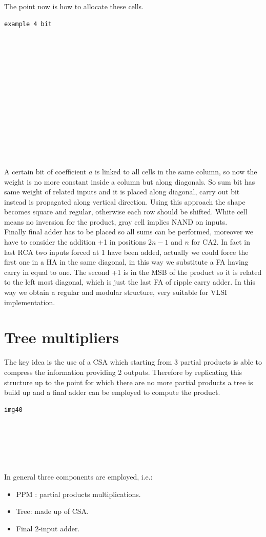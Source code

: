 The point now is how to allocate these cells.

\begin{verbatim}
example 4 bit














\end{verbatim}

A certain bit of coefficient $a$ is linked to all cells in the same column, so now the weight is no more constant inside a column but along diagonals. So sum bit has same weight of related inputs and it is placed along diagonal, carry out bit instead is propagated along vertical direction.
Using this approach the shape becomes square and regular, otherwise each row should be shifted. White cell means no inversion for the product, gray cell implies NAND on inputs.\\

Finally final adder has to be placed so all sums can be performed, moreover we have to consider the addition +1 in positions $2n-1$ and $n$ for CA2. In fact in last RCA two inputs forced at 1 have been added, actually we could force the first one in a HA in the same diagonal, in this way we substitute a FA having carry in equal to one. The second +1 is in the MSB of the product so it is related to the left most diagonal, which is just the last FA of ripple carry adder. In this way we obtain a regular and modular structure, very suitable for VLSI implementation.

\section{Tree multipliers}
The key idea is the use of a CSA which starting from 3 partial products is able to compress the information providing 2 outputs. Therefore by replicating this structure up to the point for which there are no more partial products a tree is build up and a final adder can be employed to compute the product.
\begin{verbatim}
img40






\end{verbatim}

In general three components are employed, i.e.:
\begin{itemize}
  \item PPM : partial products multiplications.
  \item Tree: made up of CSA.
  \item Final 2-input adder.
\end{itemize}


